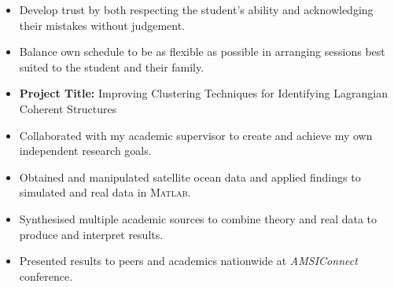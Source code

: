 \documentclass[11pt,a4paper,academicons]{altacv}
\begin{document}
\begin{fullwidth}
\begin{itemize}
		\item Develop trust by both respecting the student's ability and acknowledging their mistakes without judgement.

		\item Balance own schedule to be as flexible as possible in arranging sessions best suited to the student and their family.
	\end{itemize}

	\divider

	\begin{itemize}
		\item \textbf{Project Title:} Improving Clustering Techniques for Identifying Lagrangian Coherent Structures

		\item Collaborated with my academic supervisor to create and achieve my own independent research goals.

		\item Obtained and manipulated satellite ocean data and applied findings to simulated and real data in \textsc{Matlab}.

		\item Synthesised multiple academic sources to combine theory and real data to produce and interpret results.

		\item Presented results to peers and academics nationwide at \textit{AMSIConnect} conference.
	\end{itemize}
	\divider


\end{fullwidth}%








\end{document}

